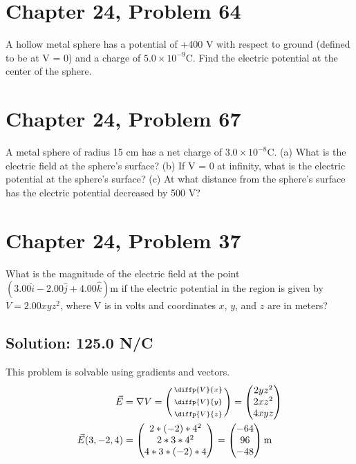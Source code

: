 \documentclass[12pt]{article}
\begin{document}
\pagebreak
\section{Chapter 24, Problem 64}
A hollow metal sphere has a potential of +400 V with respect to ground (defined to be at V = 0) and a charge of $5.0 \times 10^{-9} \unit{\coulomb}$. Find the electric potential at the center of the sphere.

\section{Chapter 24, Problem 67}
A metal sphere of radius 15 cm has a net charge of $3.0 \times 10^{-8} \unit{\coulomb}$. (a) What is the electric field at the sphere's surface? (b) If V = 0 at infinity, what is the electric potential at the sphere's
surface? (c) At what distance from the sphere's surface has the electric potential decreased by 500 V?

\section{Chapter 24, Problem 37}
What is the magnitude of the electric field at the point $(3.00\hat{i} - 2.00\hat{j} + 4.00\hat{k}) \unit{\meter}$ if the electric potential in the region is given by $V = 2.00xyz^2$, where V is in volts and coordinates $x$, $y$, and $z$ are in meters?

\subsection*{Solution: 125.0 N/C}
This problem is solvable using gradients and vectors.
\begin{align*}
    \vec{E} &=  \nabla V
        =   \left(\begin{smallmatrix} \diffp{V}{x}\\ \\ \diffp{V}{y}\\ \\ \diffp{V}{z} \end{smallmatrix}\right)
        =   \begin{pmatrix} 2yz^2\\ 2xz^2\\ 4xyz \end{pmatrix}\\
    \vec{E}(3, -2, 4)   &=  \begin{pmatrix} 2*(-2)*4^2\\ 2*3*4^2\\ 4*3*(-2)*4 \end{pmatrix}
        =   \begin{pmatrix} -64 \\ 96 \\ -48 \end{pmatrix} \unit{\meter}
\end{align*}
\end{document}
